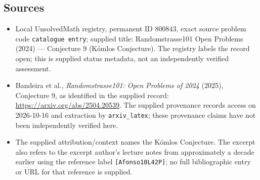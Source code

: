 \documentclass[11pt]{article}
\begin{document}
\subsection{Sources}
\begin{itemize}
\item Local UnsolvedMath registry, permanent ID \(800843\), exact source problem code \texttt{catalogue entry}; supplied title: Randomstrasse101 Open Problems (2024) --- Conjecture 9 (K\'{o}mlos Conjecture). The registry labels the record open; this is supplied status metadata, not an independently verified assessment.
\item Bandeira et al., \emph{Randomstrasse101: Open Problems of 2024} (2025), Conjecture 9, as identified in the supplied record: \url{https://arxiv.org/abs/2504.20539}. The supplied provenance records access on 2026-10-16 and extraction by \texttt{arxiv\_latex}; these provenance claims have not been independently verified here.
\item The supplied attribution/context names the K\'{o}mlos Conjecture. The excerpt also refers to the excerpt author's lecture notes from approximately a decade earlier using the reference label \texttt{[Afonso10L42P]}; no full bibliographic entry or URL for that reference is supplied.
\end{itemize}
\end{document}
